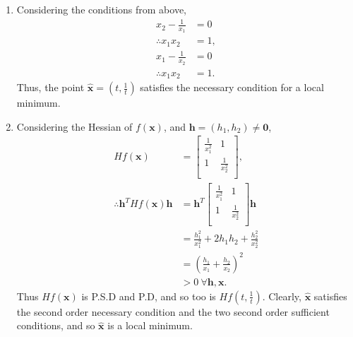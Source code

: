 \documentclass[a4paper,11pt]{article}
\newcommand{\ds}{\displaystyle}
\begin{document}
{{\begin{enumerate}[leftmargin=*]
\begin{enumerate}[label=\alph*)]
			\item Considering the conditions from above, 
				\begin{align*}
					x_2 - \frac{1}{x_1} & = 0 \\
					\therefore x_1x_2 & = 1, \\
					x_1 - \frac{1}{x_2} & = 0 \\
					\therefore x_1x_2 & = 1.
				\end{align*}
				Thus, the point $\ds{\hat{\mathbf{x}} = \left(t,\frac{1}{t}\right)}$ satisfies the necessary condition for a local minimum.
			\item Considering the Hessian of $\ds{f(\mathbf{x})}$, and $\ds{\mathbf{h} = (h_1,h_2) \neq \mathbf{0}}$,
				\begin{align*}
					Hf(\mathbf{x}) & =
					\begin{bmatrix}
						\frac{1}{x_1^2} & 1 \\
						1 & \frac{1}{x_2^2} \\
					\end{bmatrix}, \\
					\therefore \mathbf{h}^T Hf(\mathbf{x})\mathbf{h} & = \mathbf{h}^T
					\begin{bmatrix}
						\frac{1}{x_1^2} & 1 \\
						1 & \frac{1}{x_2^2} \\
					\end{bmatrix} \mathbf{h} \\
					& =\frac{h_1^2}{x_1^2} + 2h_1h_2 + \frac{h_2^2}{x_2^2} \\
					& = \left(\frac{h_1}{x_1} + \frac{h_2}{x_2}\right)^2 \\
					& > 0 \: \forall \mathbf{h},\mathbf{x}.
				\end{align*}
				Thus $\ds{Hf(\mathbf{x})}$ is P.S.D and P.D, and so too is $\ds{Hf\left(t,\frac{1}{t}\right)}$. Clearly, $\ds{\hat{\mathbf{x}}}$ satisfies the second order necessary condition and the two second order sufficient conditions, and so $\ds{\hat{\mathbf{x}}}$ is a local minimum.
					

			\end{enumerate}


\end{enumerate}}}
\end{document}
